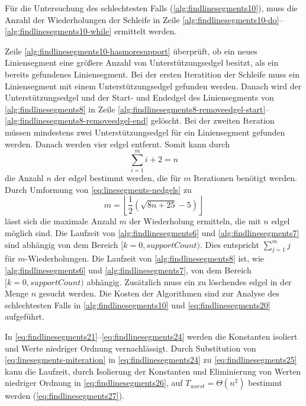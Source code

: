 Für die Untersuchung des schlechtesten Falls (\autoref{alg:findlinesegments10}), muss die Anzahl der Wiederholungen der
 Schleife in Zeile \ref{alg:findlinesegments10-do}--\ref{alg:findlinesegments10-while} ermittelt werden.

Zeile \ref{alg:findlinesegments10-hasmoresupport} überprüft, ob ein neues Liniensegment eine größere Anzahl von
 Unterstützungsedgel besitzt, als ein bereits gefundenes Liniensegment. Bei der ersten Iteratition der Schleife muss
 ein Liniensegment mit einem Unterstützungsedgel gefunden werden. Danach wird der Unterstützungsedgel und der Start-
 und Endedgel des Liniensegments von \autoref{alg:findlinesegments8} in Zeile
 \ref{alg:findlinesegments8-removeedgel-start}--\ref{alg:findlinesegments8-removeedgel-end} gelöscht. Bei der zweiten
 Iteration müssen mindestens zwei Unterstützungsedgel für ein Liniensegment gefunden werden. Danach werden vier
 \gls{edgel} entfernt. Somit kann durch
\begin{equation}
\label{eq:linesegments-nedgels}
\sum_{i=1}^{m} i + 2 = n
\end{equation}
die Anzahl $n$ der \gls{edgel} bestimmt werden, die für $m$ Iterationen benötigt werden. Durch Umformung von \autoref{eq:linesegments-nedgels} zu
\begin{equation}
\label{eq:linesegments-miteration}
m = \left\lfloor\frac{1}{2}(\sqrt{8n+25} - 5)\right\rfloor
\end{equation}
lässt sich die maximale Anzahl $m$ der Wiederholung ermitteln, die mit $n$ \gls{edgel} möglich sind. Die Laufzeit von
 \autoref{alg:findlinesegments6} und \autoref{alg:findlinesegments7} sind abhängig von dem Bereich
 $[k=0,supportCount)$. Dies entspricht $\sum_{j=1}^{m}j$ für $m$-Wiederholungen.  Die Laufzeit von
 \autoref{alg:findlinesegments8} ist, wie \autoref{alg:findlinesegments6} und \autoref{alg:findlinesegments7}, von dem
 Bereich $[k=0,supportCount)$ abhängig. Zusätzlich muss ein zu löschendes \gls{edgel} in der Menge $n$ gesucht werden.
 Die Kosten der Algorithmen sind zur Analyse des schlechtesten Falls in \autoref{alg:findlinesegments10} und
 \autoref{eq:findlinesegments20} aufgeführt.

In \autoref{eq:findlinesegments21}--\autoref{eq:findlinesegments24} werden die Konstanten isoliert und Werte niedriger
 Ordnung vernachlässigt. Durch Substitution von \autoref{eq:linesegments-miteration} in \autoref{eq:findlinesegments24}
 zu \autoref{eq:findlinesegments25} kann die Laufzeit, durch Isolierung der Konstanten und Eliminierung von Werten
 niedriger Ordnung in \autoref{eq:findlinesegments26}, auf $T_{worst}=\Theta(n^2)$ bestimmt werden
 (\autoref{eq:findlinesegments27}).
